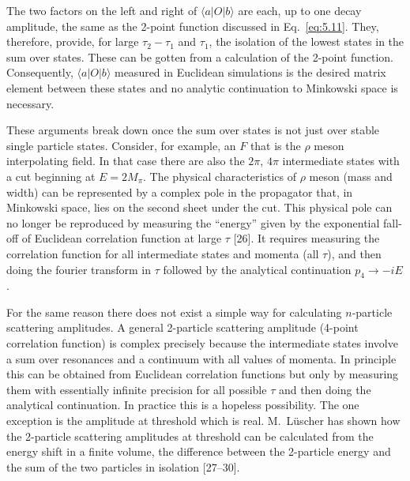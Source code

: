 The two factors on the left and right of $\langle a|O|b\rangle$ are each, up to one decay amplitude, the same as the 2-point function discussed in Eq.~\eqref{eq:5.11}. They, therefore, provide, for large $\tau_2 - \tau_1$ and $\tau_1$, the isolation of the lowest states in the sum over states. These can be gotten from a calculation of the 2-point function. Consequently, $\langle a|O|b\rangle$ measured in Euclidean simulations is the desired matrix element between these states and no analytic continuation to Minkowski space is necessary.

These arguments break down once the sum over states is not just over stable single particle states. Consider, for example, an $F$ that is the $\rho$ meson interpolating field. In that case there are also the $2\pi$, $4\pi$ intermediate states with a cut beginning at $E = 2M_\pi$. The physical characteristics of $\rho$ meson (mass and width) can be represented by a complex pole in the propagator that, in Minkowski space, lies on the second sheet under the cut. This physical pole can no longer be reproduced by measuring the ``energy'' given by the exponential fall-off of Euclidean correlation function at large $\tau$ [26]. It requires measuring the correlation function for all intermediate states and momenta (all $\tau$), and then doing the fourier transform in $\tau$ followed by the analytical continuation $p_4 \to -iE$.

For the same reason there does not exist a simple way for calculating $n$-particle scattering amplitudes. A general 2-particle scattering amplitude (4-point correlation function) is complex precisely because the intermediate states involve a sum over resonances and a continuum with all values of momenta. In principle this can be obtained from Euclidean correlation functions but only by measuring them with essentially infinite precision for all possible $\tau$ and then doing the analytical continuation. In practice this is a hopeless possibility. The one exception is the amplitude at threshold which is real. M.~L\"uscher has shown how the 2-particle scattering amplitudes at threshold can be calculated from the energy shift in a finite volume, the difference between the 2-particle energy and the sum of the two particles in isolation [27--30].
